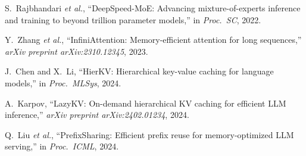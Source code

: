 \documentclass[conference]{IEEEtran}
\begin{document}
\begin{thebibliography}{8}
S.~Rajbhandari \emph{et al.}, ``DeepSpeed-MoE: Advancing mixture-of-experts inference and training to beyond trillion parameter models,'' in \emph{Proc.\ SC}, 2022.

Y.~Zhang \emph{et al.}, ``InfiniAttention: Memory-efficient attention for long sequences,'' \emph{arXiv preprint arXiv:2310.12345}, 2023.

J.~Chen and X.~Li, ``HierKV: Hierarchical key-value caching for language models,'' in \emph{Proc.\ MLSys}, 2024.

A.~Karpov, ``LazyKV: On-demand hierarchical KV caching for efficient LLM inference,'' \emph{arXiv preprint arXiv:2402.01234}, 2024.

Q.~Liu \emph{et al.}, ``PrefixSharing: Efficient prefix reuse for memory-optimized LLM serving,'' in \emph{Proc.\ ICML}, 2024.

\end{thebibliography}
\end{document}
